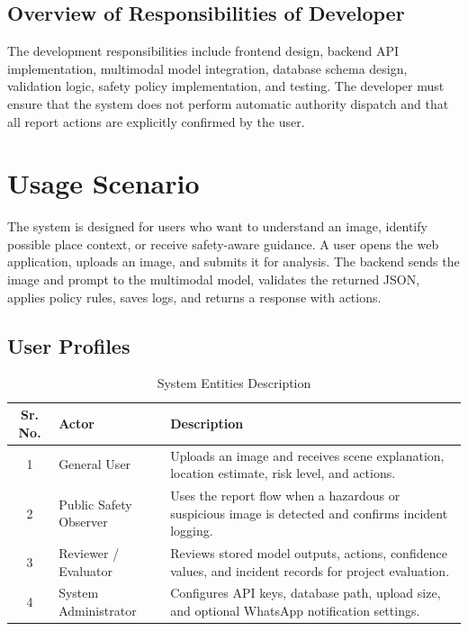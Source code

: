 \subsection{Overview of Responsibilities of Developer}
The development responsibilities include frontend design, backend API implementation, multimodal model integration, database schema design, validation logic, safety policy implementation, and testing. The developer must ensure that the system does not perform automatic authority dispatch and that all report actions are explicitly confirmed by the user.

\section{Usage Scenario}
The system is designed for users who want to understand an image, identify possible place context, or receive safety-aware guidance. A user opens the web application, uploads an image, and submits it for analysis. The backend sends the image and prompt to the multimodal model, validates the returned JSON, applies policy rules, saves logs, and returns a response with actions.

\subsection{User Profiles}
\begin{table}[H]
\centering
\caption{System Entities Description}
\label{tab:entities}
\def\arraystretch{1.5}
\begin{tabularx}{\textwidth}{|c|l|X|}
\hline
\textbf{Sr. No.} & \textbf{Actor} & \textbf{Description} \\ \hline
1 & General User & Uploads an image and receives scene explanation, location estimate, risk level, and actions. \\ \hline
2 & Public Safety Observer & Uses the report flow when a hazardous or suspicious image is detected and confirms incident logging. \\ \hline
3 & Reviewer / Evaluator & Reviews stored model outputs, actions, confidence values, and incident records for project evaluation. \\ \hline
4 & System Administrator & Configures API keys, database path, upload size, and optional WhatsApp notification settings. \\ \hline
\end{tabularx}
\end{table}

